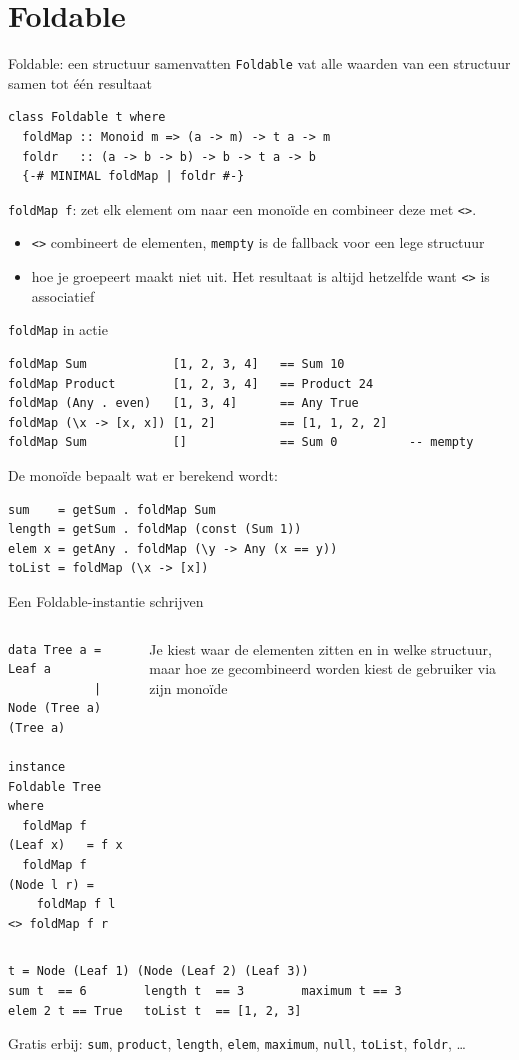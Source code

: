 \documentclass[aspectratio=169,11pt]{beamer}
\newcommand{\hs}{\lstinline[style=hsinline]}
\begin{document}
\section{Foldable}

\begin{frame}[fragile]{Foldable: een structuur samenvatten}
  \hs{Foldable} vat alle waarden van een structuur samen tot één resultaat
  \pause
\begin{lstlisting}
class Foldable t where
  foldMap :: Monoid m => (a -> m) -> t a -> m
  foldr   :: (a -> b -> b) -> b -> t a -> b
  {-# MINIMAL foldMap | foldr #-}
\end{lstlisting}
  \pause
  \hs{foldMap f}: zet elk element om naar een \alert{monoïde} en combineer deze met \hs{<>}.
  \begin{itemize}
    \item \hs{<>} combineert de elementen, \hs{mempty} is de fallback voor een lege structuur
    \item hoe je groepeert maakt niet uit. Het resultaat is altijd hetzelfde want \hs{<>} is associatief
  \end{itemize}
\end{frame}

\begin{frame}[fragile]{\texttt{foldMap} in actie}
\begin{lstlisting}
foldMap Sum            [1, 2, 3, 4]   == Sum 10
foldMap Product        [1, 2, 3, 4]   == Product 24
foldMap (Any . even)   [1, 3, 4]      == Any True
foldMap (\x -> [x, x]) [1, 2]         == [1, 1, 2, 2]
foldMap Sum            []             == Sum 0          -- mempty
\end{lstlisting}
  \pause
  De monoïde bepaalt wat er berekend wordt:
\begin{lstlisting}
sum    = getSum . foldMap Sum
length = getSum . foldMap (const (Sum 1))
elem x = getAny . foldMap (\y -> Any (x == y))
toList = foldMap (\x -> [x])
\end{lstlisting}
\end{frame}

\begin{frame}[fragile]{Een Foldable-instantie schrijven}
  \begin{columns}[T]
\begin{lstlisting}
data Tree a = Leaf a
            | Node (Tree a) (Tree a)

instance Foldable Tree where
  foldMap f (Leaf x)   = f x
  foldMap f (Node l r) =
    foldMap f l <> foldMap f r
\end{lstlisting}
    Je kiest \alert{waar} de elementen zitten en in welke structuur,
    maar hoe ze gecombineerd worden kiest de gebruiker via zijn \alert{monoïde}
  \end{columns}
  \pause
\begin{lstlisting}
t = Node (Leaf 1) (Node (Leaf 2) (Leaf 3))
sum t  == 6        length t  == 3        maximum t == 3
elem 2 t == True   toList t  == [1, 2, 3]
\end{lstlisting}
  Gratis erbij: \hs{sum}, \hs{product}, \hs{length}, \hs{elem}, \hs{maximum},
  \hs{null}, \hs{toList}, \hs{foldr}, \dots
\end{frame}
\end{document}
